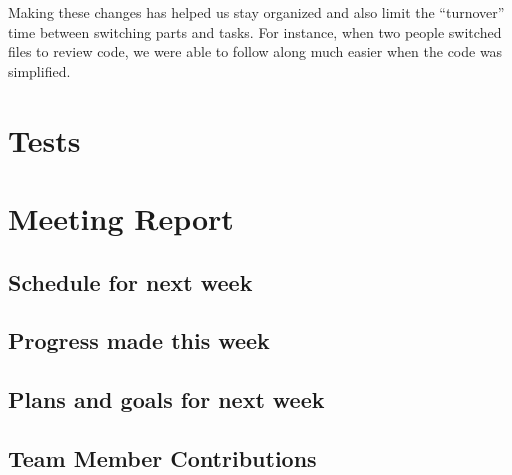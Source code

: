 \documentclass[12pt]{article}
\begin{document}
    Making these changes has helped us stay organized and also limit the “turnover” time between switching parts and tasks. For instance, when two people switched files to review code, we were able to follow along much easier when the code was simplified.


\section{Tests}



\section{Meeting Report}
\subsection{Schedule for next week}

\subsection{Progress made this week}

\subsection{Plans and goals for next week}
\subsection{Team Member Contributions}
\end{document}
